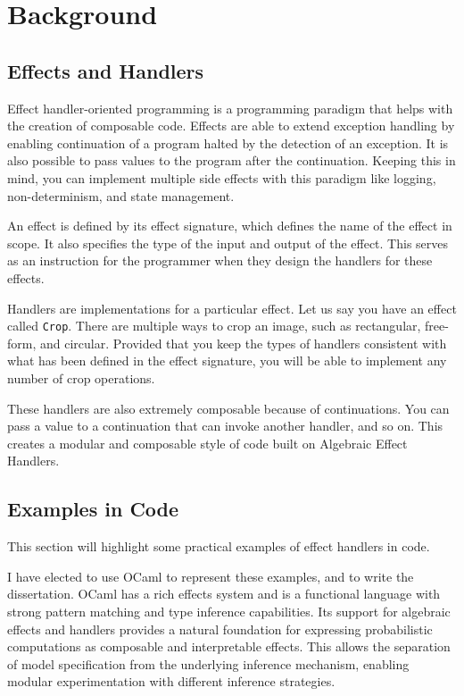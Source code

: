 \documentclass[logo,bsc,singlespacing,parskip,online]{infthesis}
\begin{document}
\chapter{Background}

\section{Effects and Handlers}

Effect handler-oriented programming is a programming paradigm that helps with the creation of composable code. Effects are able to extend exception handling by enabling continuation of a program halted by the detection of an exception. It is also possible to pass values to the program after the continuation. Keeping this in mind, you can implement multiple side effects with this paradigm like logging, non-determinism, and state management.

An effect is defined by its effect signature, which defines the name of the effect in scope. It also specifies the type of the input and output of the effect. This serves as an instruction for the programmer when they design the handlers for these effects. 

Handlers are implementations for a particular effect. Let us say you have an effect called \texttt{Crop}. There are multiple ways to crop an image, such as rectangular, free-form, and circular. Provided that you keep the types of handlers consistent with what has been defined in the effect signature, you will be able to implement any number of crop operations.

These handlers are also extremely composable because of continuations. You can pass a value to a continuation that can invoke another handler, and so on. This creates a modular and composable style of code built on Algebraic Effect Handlers. 

\section{Examples in Code}

This section will highlight some practical examples of effect handlers in code. 

I have elected to use OCaml to represent these examples, and to write the dissertation. OCaml has a rich effects system and is a functional language with strong pattern matching and type inference capabilities. Its support for algebraic effects and handlers provides a natural foundation for expressing probabilistic computations as composable and interpretable effects. This allows the separation of model specification from the underlying inference mechanism, enabling modular experimentation with different inference strategies. 
\end{document}
